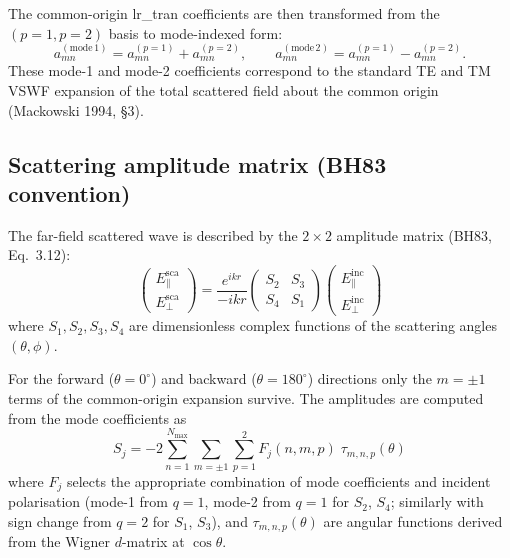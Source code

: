\documentclass[11pt,a4paper]{article}
\begin{document}
The common-origin lr\_tran coefficients are then transformed from the $(p=1, p=2)$ basis to mode-indexed form:
\begin{equation}
  a_{mn}^{(\text{mode}\,1)} = a_{mn}^{(p=1)} + a_{mn}^{(p=2)}, \qquad
  a_{mn}^{(\text{mode}\,2)} = a_{mn}^{(p=1)} - a_{mn}^{(p=2)}.
  \label{eq:mode-transform}
\end{equation}
These mode-1 and mode-2 coefficients correspond to the standard TE and TM VSWF expansion of the total scattered field about the common origin (Mackowski 1994, \S 3).

\subsection{Scattering amplitude matrix (BH83 convention)}

The far-field scattered wave is described by the $2 \times 2$ amplitude matrix (BH83, Eq.~3.12):
\begin{equation}
  \begin{pmatrix} E_\parallel^\mathrm{sca} \\ E_\perp^\mathrm{sca} \end{pmatrix}
  = \frac{e^{ikr}}{-ikr}
  \begin{pmatrix} S_2 & S_3 \\ S_4 & S_1 \end{pmatrix}
  \begin{pmatrix} E_\parallel^\mathrm{inc} \\ E_\perp^\mathrm{inc} \end{pmatrix}
  \label{eq:bh83-amplitude}
\end{equation}
where $S_1, S_2, S_3, S_4$ are dimensionless complex functions of the scattering angles $(\theta, \phi)$.

For the forward ($\theta = 0^\circ$) and backward ($\theta = 180^\circ$) directions only the $m = \pm 1$ terms of the common-origin expansion survive.
The amplitudes are computed from the mode coefficients as
\begin{equation}
  S_j = -2 \sum_{n=1}^{N_\mathrm{max}} \sum_{m = \pm 1} \sum_{p = 1}^{2}
  F_j(n, m, p)\;\tau_{m,n,p}(\theta)
  \label{eq:amplitude-sum}
\end{equation}
where $F_j$ selects the appropriate combination of mode coefficients and incident polarisation (mode-1 from $q=1$, mode-2 from $q=1$ for $S_2$, $S_4$; similarly with sign change from $q=2$ for $S_1$, $S_3$), and $\tau_{m,n,p}(\theta)$ are angular functions derived from the Wigner $d$-matrix at $\cos\theta$.
\end{document}
